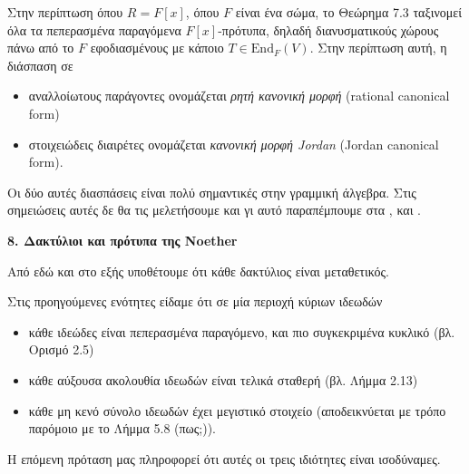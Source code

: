 \documentclass[12pt,a4paper,reqno]{amsart}
\theoremstyle{definition}
\theoremstyle{remark}
\numberwithin{theorem}{section}
\numberwithin{exercise}{section}
\numberwithin{equation}{section}
\newcommand{\End}{\mathrm{End}}
\begin{document}
Στην περίπτωση όπου $R = F[x]$, όπου $F$ είναι ένα σώμα, το Θεώρημα 7.3 ταξινομεί όλα τα πεπερασμένα παραγόμενα $F[x]$-πρότυπα, δηλαδή διανυσματικούς χώρους πάνω από το $F$ εφοδιασμένους με κάποιο $T \in \End_F(V)$. Στην περίπτωση αυτή, η διάσπαση σε
\begin{itemize}
    \item αναλλοίωτους παράγοντες ονομάζεται \emph{ρητή κανονική μορφή} (rational canonical form)
    \item στοιχειώδεις διαιρέτες ονομάζεται \emph{κανονική μορφή Jordan} (Jordan canonical form).
\end{itemize} 
Οι δύο αυτές διασπάσεις είναι πολύ σημαντικές στην γραμμική άλγεβρα. Στις σημειώσεις αυτές δε θα τις μελετήσουμε και γι αυτό παραπέμπουμε στα \cite[Ενότητα 3, Μέρος II]{EKPA_LA}, \cite[Κεφάλαιο 7]{EKPA_PID} και \cite[Κεφάλαιο 12]{DF04}.


\newpage 
\setcounter{section}{8}
\setcounter{theorem}{0}
\setcounter{equation}{0}
\begin{center}
    \textbf{8. Δακτύλιοι και πρότυπα της Noether
} 
\end{center}

Από εδώ και στο εξής υποθέτουμε ότι κάθε δακτύλιος είναι μεταθετικός.

Στις προηγούμενες ενότητες είδαμε ότι σε μία περιοχή κύριων ιδεωδών
\begin{itemize}
    \item κάθε ιδεώδες είναι πεπερασμένα παραγόμενο, και πιο συγκεκριμένα κυκλικό (βλ. Ορισμό 2.5)
    \item κάθε αύξουσα ακολουθία ιδεωδών είναι τελικά σταθερή (βλ. Λήμμα 2.13)
    \item κάθε μη κενό σύνολο ιδεωδών έχει μεγιστικό στοιχείο (αποδεικνύεται με τρόπο παρόμοιο με το Λήμμα 5.8 (πως;)).
\end{itemize}
Η επόμενη πρόταση μας πληροφορεί ότι αυτές οι τρεις ιδιότητες είναι ισοδύναμες.
\end{document}

